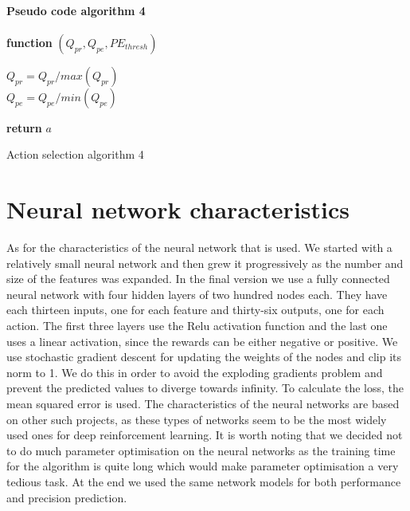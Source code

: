 \paragraph{Pseudo code algorithm 4}
\begin{center}
	\begin{algorithm}[H]

    \textbf{function}  $(Q_{pr},Q_{pe},PE_{thresh})$\;
    
    
    \Indp{}\Indm
    \Indp{} \Indm
    \Indp
    $Q_{pr} = Q_{pr}/max(Q_{pr})$\\
    $Q_{pe} = Q_{pe}/min(Q_{pe})$\\
   
  
   \textbf{return} $a$
   
    
\caption{Action selection algorithm 4}
\end{algorithm}
\end{center}
\section{Neural network characteristics}
As for the characteristics of the neural network that is used. We started with a relatively small neural network and then grew it progressively as the number and size of the features was expanded. In the final version we use a fully connected neural network with four hidden layers of two hundred nodes each. They have each thirteen inputs, one for each feature and thirty-six outputs, one for each action. The first three layers use the Relu activation function and the last one uses a linear activation, since the rewards can be either negative or positive. We use stochastic gradient descent for updating the weights of the nodes and clip its norm to 1. We do this in order to avoid the exploding gradients problem and prevent the predicted values to diverge towards infinity. To calculate the loss, the mean squared error is used. The characteristics of the neural networks are based on other such projects, as these types of networks seem to be the most widely used ones for deep reinforcement learning. It is worth noting that we decided not to do much parameter optimisation on the neural networks as the training time for the algorithm is quite long which would make parameter optimisation a very tedious task. At the end we used the same network models for both performance and precision prediction.
